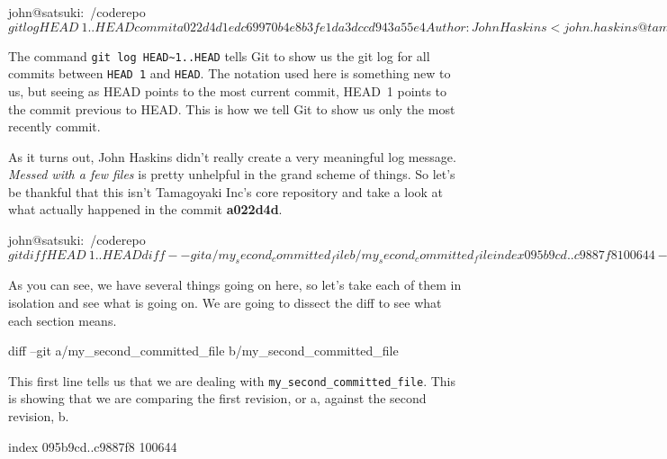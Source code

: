 \begin{code}
john@satsuki:~/coderepo$ git log HEAD~1..HEAD
commit a022d4d1edc69970b4e8b3fe1da3dccd943a55e4
Author: John Haskins <john.haskins@tamagoyakiinc.koala>
Date:   Thu Mar 31 22:05:55 2011 +0100

    Messed with a few files
john@satsuki:~/coderepo$
\end{code}

The command \texttt{git log HEAD\textasciitilde{}1..HEAD} tells Git to show us the git log for all commits between \texttt{HEAD~1} and \texttt{HEAD}.
The notation used here is something new to us, but seeing as HEAD points to the most current commit, HEAD~1 points to the commit previous to HEAD.
This is how we tell Git to show us only the most recently commit.

As it turns out, John Haskins didn't really create a very meaningful log message.
\emph{Messed with a few files} is pretty unhelpful in the grand scheme of things.
So let's be thankful that this isn't Tamagoyaki Inc's core repository and take a look at what actually happened in the commit \textbf{a022d4d}.

\begin{code}
john@satsuki:~/coderepo$ git diff HEAD~1..HEAD
diff --git a/my_second_committed_file b/my_second_committed_file
index 095b9cd..c9887f8 100644
--- a/my_second_committed_file
+++ b/my_second_committed_file
@@ -1,2 +1 @@
-Change1
-Change2
+Changed this file completely
diff --git a/my_third_committed_file b/my_third_committed_file
new file mode 100644
index 0000000..5d27866
--- /dev/null
+++ b/my_third_committed_file
@@ -0,0 +1 @@
+Addition to the line
john@satsuki:~/coderepo$
\end{code}

As you can see, we have several things going on here, so let's take each of them in isolation and see what is going on.
We are going to dissect the diff to see what each section means.

\begin{code}
diff --git a/my_second_committed_file b/my_second_committed_file
\end{code}

This first line tells us that we are dealing with \newline\texttt{my\_second\_committed\_file}.
This is showing that we are comparing the first revision, or a, against the second revision, b.

\begin{code}
index 095b9cd..c9887f8 100644
\end{code}

